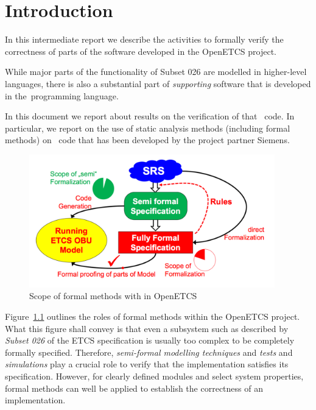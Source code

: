
\chapter{Introduction}
\label{cha:intro}

In this intermediate report we describe the activities to formally verify
the correctness of parts of the software developed in the OpenETCS project.

While major parts of the functionality of {Subset 026} are modelled in 
higher-level languages, there is also a substantial part of \emph{supporting} software
that is developed in the~\isoc programming language.

In this document we report about results on the verification of that \isoc~code.
In particular, we report on the use of static analysis methods (including formal methods)
on \isoc~code that has been developed by the project partner Siemens.

\begin{figure}[hbt]
\begin{center}
\includegraphics[width=0.95\textwidth]{figures/scope-of-formalization.pdf}
\caption{\label{fig:scope-of-formalization} Scope of formal methods with in OpenETCS}
\end{center}
\end{figure}

Figure~\ref{fig:scope-of-formalization} outlines the roles of formal methods
within the OpenETCS project.
What this figure shall convey is that even a subsystem such as described by
\emph{Subset 026} of the ETCS specification
is usually too complex to be completely formally specified.
Therefore, \emph{semi-formal modelling techniques} and \emph{tests} and 
\emph{simulations} play a crucial role to verify that the implementation
satisfies its specification.
However, for clearly defined modules and select system properties, formal methods
can well be applied to establish the correctness of an implementation.

